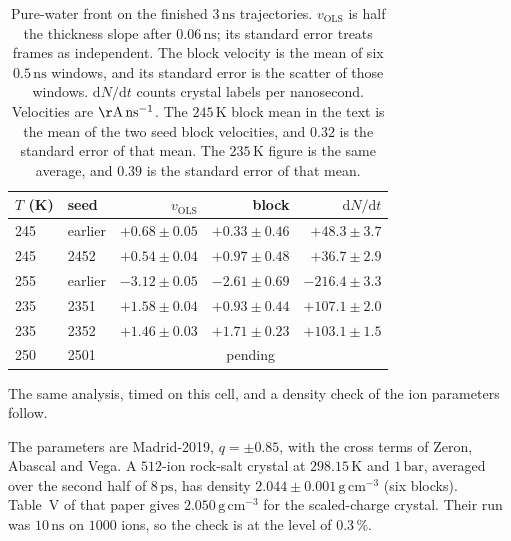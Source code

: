 \begin{table}[t]
\centering
\caption{Pure-water front on the finished $3\,\mathrm{ns}$ trajectories.
$v_{\mathrm{OLS}}$ is half the thickness slope after $0.06\,\mathrm{ns}$;
its standard error treats frames as independent.
The block velocity is the mean of six $0.5\,\mathrm{ns}$ windows,
and its standard error is the scatter of those windows.
$\mathrm{d}N/\mathrm{d}t$ counts crystal labels per nanosecond.
Velocities are $\mathrm{\AA\,ns^{-1}}$.
The $245\,\mathrm{K}$ block mean in the text is the mean of the two
seed block velocities, and $0.32$ is the standard error of that mean.
The $235\,\mathrm{K}$ figure is the same average, and $0.39$ is the
standard error of that mean.}
\label{tab:brine-front-v}
\begin{tabular}{llrrr}
\hline
$T$ (K) & seed & $v_{\mathrm{OLS}}$ & block & $\mathrm{d}N/\mathrm{d}t$ \\
\hline
245 & earlier & $+0.68\pm 0.05$ & $+0.33\pm 0.46$ & $+48.3\pm 3.7$ \\
245 & 2452 & $+0.54\pm 0.04$ & $+0.97\pm 0.48$ & $+36.7\pm 2.9$ \\
255 & earlier & $-3.12\pm 0.05$ & $-2.61\pm 0.69$ & $-216.4\pm 3.3$ \\
235 & 2351 & $+1.58\pm 0.04$ & $+0.93\pm 0.44$ & $+107.1\pm 2.0$ \\
235 & 2352 & $+1.46\pm 0.03$ & $+1.71\pm 0.23$ & $+103.1\pm 1.5$ \\
250 & 2501 & \multicolumn{3}{c}{pending} \\
\hline
\end{tabular}
\end{table}

The same analysis, timed on this cell, and a density check of the
ion parameters follow.

The parameters are Madrid-2019, $q=\pm 0.85$, with the cross terms
of Zeron, Abascal and Vega.\cite{zeron2019}
A $512$-ion rock-salt crystal at $298.15\,\mathrm{K}$ and
$1\,\mathrm{bar}$, averaged over the second half of $8\,\mathrm{ps}$,
has density $2.044\pm 0.001\,\mathrm{g\,cm^{-3}}$ (six blocks).
Table~V of that paper gives $2.050\,\mathrm{g\,cm^{-3}}$ for the
scaled-charge crystal.
Their run was $10\,\mathrm{ns}$ on $1000$ ions, so the check is at
the level of $0.3\,\%$.

